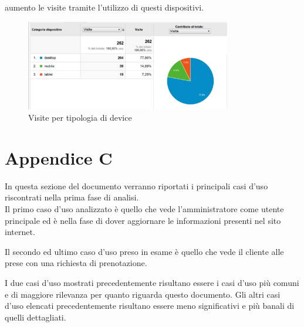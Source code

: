 \documentclass[a4paper,12pt,hidelinks]{report}
\begin{document}
  aumento le visite tramite l'utilizzo di questi dispositivi.
  \begin{figure}[h!]%
    \includegraphics[width=0.80\textwidth,keepaspectratio=true]{img/googleTecnologia}
    \centering
    \caption{Visite per tipologia di device}%
    \label{fig:googleTecnologia}%
  \end{figure}
  
\newpage
\section{Appendice C}
In questa sezione del documento verranno riportati i principali casi d'uso riscontrati nella prima fase di analisi.
\\Il primo caso d'uso analizzato è quello che vede l'amministratore come utente principale ed è nella fase di dover aggiornare le informazioni presenti nel sito internet.
  
Il secondo ed ultimo caso d'uso preso in esame è quello che vede il cliente alle prese con una richiesta di prenotazione.
  
\par I due casi d'uso mostrati precedentemente risultano essere i casi d'uso più comuni e di maggiore rilevanza per quanto riguarda questo documento. Gli altri casi d'uso 
elencati precedentemente risultano essere meno significativi e più banali di quelli dettagliati.
\end{document}
